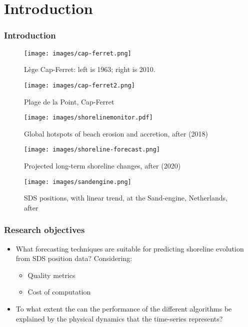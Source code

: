 \documentclass[10pt]{beamer}
\theoremstyle{remark}
\theoremstyle{definition}
\begin{document}
\section{Introduction}
\begin{frame}[allowframebreaks]
\frametitle{Introduction}

\begin{figure}
        \centering
        \texttt{[image: images/cap-ferret.png]}
        \caption{L\`{e}ge Cap-Ferret: left is 1963; right is 2010.}
        \label{fig:cap-ferret-1}
\end{figure}

\framebreak

\begin{figure}
	\centering
	\texttt{[image: images/cap-ferret2.png]}
	\caption{Plage de la Point, Cap-Ferret}
	\label{fig:cap-ferret-2}
\end{figure}

\framebreak

\begin{figure}
	\centering
	\texttt{[image: images/shorelinemonitor.pdf]}
	\caption{Global hotspots of beach erosion and accretion, after \textcite{Luijendijk2018state}(2018)}
	\label{fig:erosion-trends}
\end{figure}

\framebreak

\begin{figure}
	\centering
	\texttt{[image: images/shoreline-forecast.png]}
	\caption{Projected long-term shoreline changes, after \textcite{vousdoukas2020sandy}(2020)}
	\label{fig:lr-forecast-changes}
\end{figure}

\framebreak

\begin{figure}
	\centering
	\texttt{[image: images/sandengine.png]}
	\caption{SDS positions, with linear trend, at the Sand-engine, Netherlands, after \textcite{Kras2019shoreline}}
	\label{fig:sand-engine-example}
\end{figure}

\end{frame}

\begin{frame}
\frametitle{Research objectives}
	\begin{itemize}
		\item <1->What forecasting techniques are suitable for predicting shoreline evolution from SDS position data? Considering:  
		\begin{itemize}
			\item<2-> Quality metrics
			\item<3-> Cost of computation
		\end{itemize}
		\item<4-> To what extent the can the performance of the different algorithms be explained by the physical dynamics that the time-series represents? 

	\end{itemize}
\end{frame}
\end{document}
